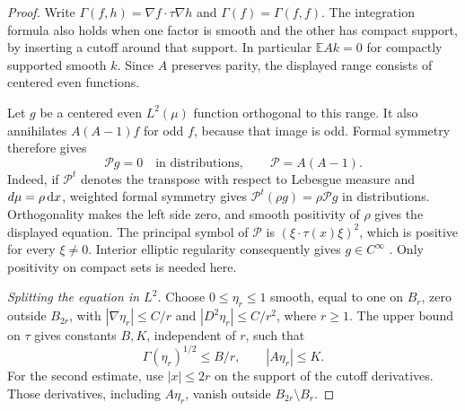\begin{proof}
Write $\Gamma(f,h)=\nabla f\cdot\tau\nabla h$ and $\Gamma(f)=\Gamma(f,f)$.  The integration formula also holds when one factor is smooth and the other has compact support, by inserting a cutoff around that support.  In particular $\mathbb{E}Ak=0$ for compactly supported smooth $k$.  Since $A$ preserves parity, the displayed range consists of centered even functions.

Let $g$ be a centered even $L^2(\mu)$ function orthogonal to this range. It also annihilates $A(A-1)f$ for odd $f$, because that image is odd. Formal symmetry therefore gives
\[
 \mathcal{P} g=0\quad\text{in distributions},\qquad \mathcal{P}=A(A-1).
\]
Indeed, if $\mathcal{P}^t$ denotes the transpose with respect to Lebesgue measure and $d\mu=\rho\,\mathrm{d} x$, weighted formal symmetry gives $\mathcal{P}^t(\rho g)=\rho\mathcal{P} g$ in distributions. Orthogonality makes the left side zero, and smooth positivity of $\rho$ gives the displayed equation.  The principal symbol of $\mathcal{P}$ is $(\xi\cdot\tau(x)\xi)^2$, which is positive for every $\xi\ne0$. Interior elliptic regularity consequently gives $g\in C^\infty$ \cite[Theorem~14.2]{Dyatlov2026}.  Only positivity on compact sets is needed here.

\smallskip \noindent\emph{Splitting the equation in $L^2$.} Choose $0\le\eta_r\le1$ smooth, equal to one on $B_r$, zero outside $B_{2r}$, with $|\nabla\eta_r|\le C/r$ and $|D^2\eta_r|\le C/r^2$, where $r\ge1$.  The upper bound on $\tau$ gives constants $B,K$, independent of $r$, such that
\begin{equation}\label{eq:density-cutoff}
 \Gamma(\eta_r)^{1/2}\le B/r,
 \qquad |A\eta_r|\le K.
\end{equation}
For the second estimate, use $|x|\le2r$ on the support of the cutoff derivatives.  Those derivatives, including $A\eta_r$, vanish outside $B_{2r}\setminus B_r$.


\end{proof}
